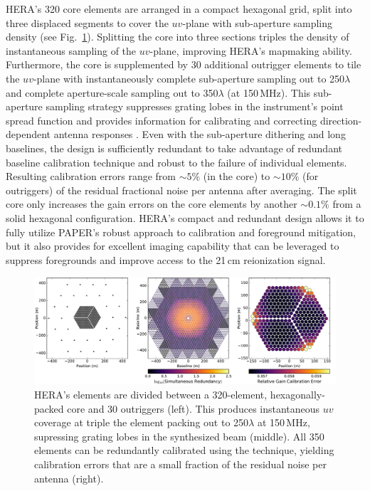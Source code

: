 \documentclass[preprint,11pt]{aastex}
\begin{document}
HERA's 320 core elements are arranged in a compact hexagonal grid, split into three displaced segments to cover the $uv$-plane with sub-aperture sampling density (see Fig.~\ref{fig:arrayConfig}). Splitting the core into three sections triples the density of instantaneous sampling of the $uv$-plane, improving HERA's mapmaking ability.  Furthermore, the core is supplemented by 30 additional outrigger elements to tile the $uv$-plane with instantaneously complete sub-aperture sampling out to 250$\lambda$ and complete aperture-scale sampling out to 350$\lambda$ (at 150\,MHz). 
This sub-aperture sampling strategy suppresses grating lobes in the instrument's point spread function and provides information for calibrating and correcting direction-dependent antenna responses \citep{dillon_parsons2016}.
Even with the sub-aperture dithering and long baselines, the design is sufficiently redundant to take advantage of redundant baseline calibration technique and robust to the failure of individual elements.
Resulting calibration errors range from $\sim 5\%$ (in the core) to $\sim 10\%$ (for outriggers) of the residual fractional noise per antenna after averaging. 
The split core only increases the gain errors on the core elements by another $\sim 0.1\%$ from a solid hexagonal configuration. HERA's compact and redundant design allows it to fully utilize PAPER's robust approach to calibration and foreground mitigation, but it also provides for excellent imaging capability that can be leveraged to suppress foregrounds and improve access to the 21\,cm reionization signal.

\begin{figure}[h]
	\centering
	\vspace{-5pt}
	\includegraphics[width=1\textwidth,clip]{plots/HERA_Array_Config.pdf}
	\vspace{-25pt}
	\caption{HERA's elements are divided between a 320-element, hexagonally-packed core and 30 outriggers (left). This produces instantaneous
$uv$ coverage at triple the element packing out to 250$\lambda$ at 150\,MHz, supressing grating lobes in the synthesized beam (middle). All 350 elements can be redundantly calibrated 
using the \citet{liu_et_al2010} technique, yielding calibration errors that are a small fraction of the residual noise per antenna (right).}
		\label{fig:arrayConfig}
			\vspace{-10pt}
\end{figure}
\end{document}
